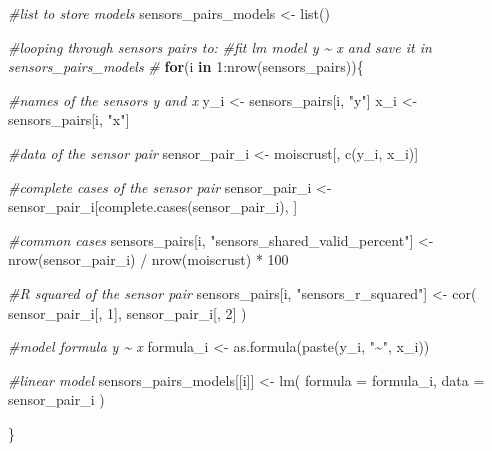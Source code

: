 \documentclass[
  table]{article}
\newenvironment{Shaded}{\begin{snugshade}}{\end{snugshade}}
\newcommand{\AttributeTok}[1]{\textcolor[rgb]{0.77,0.63,0.00}{#1}}
\newcommand{\CommentTok}[1]{\textcolor[rgb]{0.56,0.35,0.01}{\textit{#1}}}
\newcommand{\ControlFlowTok}[1]{\textcolor[rgb]{0.13,0.29,0.53}{\textbf{#1}}}
\newcommand{\DecValTok}[1]{\textcolor[rgb]{0.00,0.00,0.81}{#1}}
\newcommand{\FunctionTok}[1]{\textcolor[rgb]{0.00,0.00,0.00}{#1}}
\newcommand{\NormalTok}[1]{#1}
\newcommand{\OtherTok}[1]{\textcolor[rgb]{0.56,0.35,0.01}{#1}}
\newcommand{\SpecialCharTok}[1]{\textcolor[rgb]{0.00,0.00,0.00}{#1}}
\newcommand{\StringTok}[1]{\textcolor[rgb]{0.31,0.60,0.02}{#1}}
\begin{document}
\begin{Shaded}
\begin{Highlighting}[]
\CommentTok{\#list to store models}
\NormalTok{sensors\_pairs\_models }\OtherTok{\textless{}{-}} \FunctionTok{list}\NormalTok{()}

\CommentTok{\#looping through sensors pairs to:}
\CommentTok{\#fit lm model y \textasciitilde{} x and save it in sensors\_pairs\_models}
\CommentTok{\#}
\ControlFlowTok{for}\NormalTok{(i }\ControlFlowTok{in} \DecValTok{1}\SpecialCharTok{:}\FunctionTok{nrow}\NormalTok{(sensors\_pairs))\{}
  
  \CommentTok{\#names of the sensors y and x}
\NormalTok{  y\_i }\OtherTok{\textless{}{-}}\NormalTok{ sensors\_pairs[i, }\StringTok{"y"}\NormalTok{]}
\NormalTok{  x\_i }\OtherTok{\textless{}{-}}\NormalTok{ sensors\_pairs[i, }\StringTok{"x"}\NormalTok{]}
  
  \CommentTok{\#data of the sensor pair}
\NormalTok{  sensor\_pair\_i }\OtherTok{\textless{}{-}}\NormalTok{ moiscrust[, }\FunctionTok{c}\NormalTok{(y\_i, x\_i)]}
  
  \CommentTok{\#complete cases of the sensor pair}
\NormalTok{  sensor\_pair\_i }\OtherTok{\textless{}{-}}\NormalTok{ sensor\_pair\_i[}\FunctionTok{complete.cases}\NormalTok{(sensor\_pair\_i), ]}
   
  \CommentTok{\#common cases}
\NormalTok{  sensors\_pairs[i, }\StringTok{"sensors\_shared\_valid\_percent"}\NormalTok{] }\OtherTok{\textless{}{-}} 
    \FunctionTok{nrow}\NormalTok{(sensor\_pair\_i) }\SpecialCharTok{/} \FunctionTok{nrow}\NormalTok{(moiscrust) }\SpecialCharTok{*} \DecValTok{100}
  
  \CommentTok{\#R squared of the sensor pair}
\NormalTok{  sensors\_pairs[i, }\StringTok{"sensors\_r\_squared"}\NormalTok{] }\OtherTok{\textless{}{-}} \FunctionTok{cor}\NormalTok{(}
\NormalTok{    sensor\_pair\_i[, }\DecValTok{1}\NormalTok{],}
\NormalTok{    sensor\_pair\_i[, }\DecValTok{2}\NormalTok{]}
\NormalTok{    )}
  
  \CommentTok{\#model formula y \textasciitilde{} x}
\NormalTok{  formula\_i }\OtherTok{\textless{}{-}} \FunctionTok{as.formula}\NormalTok{(}\FunctionTok{paste}\NormalTok{(y\_i, }\StringTok{"\textasciitilde{}"}\NormalTok{, x\_i))}
  
  \CommentTok{\#linear model}
\NormalTok{  sensors\_pairs\_models[[i]] }\OtherTok{\textless{}{-}} \FunctionTok{lm}\NormalTok{(}
    \AttributeTok{formula =}\NormalTok{ formula\_i,}
    \AttributeTok{data =}\NormalTok{ sensor\_pair\_i}
\NormalTok{  )}
  
\NormalTok{\}}


\end{Highlighting}
\end{Shaded}
\end{document}
